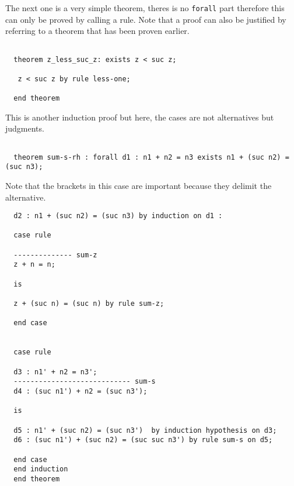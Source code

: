 \documentclass[12pt]{article}
\begin{document}
The next one is a very simple theorem, theres is no {\tt forall} part therefore this can only be proved by calling a rule. Note that a proof can also be justified by referring to a theorem
that has been proven earlier.
\begin{verbatim}

  theorem z_less_suc_z: exists z < suc z;

   z < suc z by rule less-one;

  end theorem
\end{verbatim}
This is another induction proof but here, the cases are not alternatives but judgments.
\begin{verbatim}

  theorem sum-s-rh : forall d1 : n1 + n2 = n3 exists n1 + (suc n2) = (suc n3);

\end{verbatim}
Note that the brackets in this case are important because they delimit the alternative.
\begin{verbatim}
  d2 : n1 + (suc n2) = (suc n3) by induction on d1 :

  case rule

  -------------- sum-z
  z + n = n;

  is

  z + (suc n) = (suc n) by rule sum-z;

  end case


  case rule

  d3 : n1' + n2 = n3';
  ---------------------------- sum-s
  d4 : (suc n1') + n2 = (suc n3');

  is

  d5 : n1' + (suc n2) = (suc n3')  by induction hypothesis on d3;
  d6 : (suc n1') + (suc n2) = (suc suc n3') by rule sum-s on d5;

  end case
  end induction
  end theorem
\end{verbatim}
\end{document}
